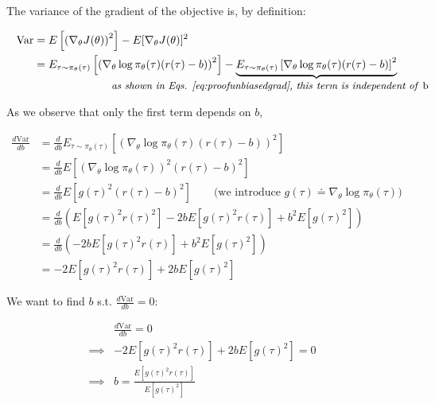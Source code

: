 \documentclass{article}
\begin{document}
The variance of the gradient of the objective is, by definition:

\begin{subequations}
  \begin{align}
    \operatorname{Var}
      &=E\left[\left(\nabla_\theta J(\theta)\right)^{2}\right]-E[\nabla_\theta J(\theta)]^2\\
      &=E_{\tau \sim \pi_{\theta}(\tau)}\left[\left(\nabla_{\theta} \log \pi_{\theta}(\tau)(r(\tau)-b)\right)^{2}\right]-\underbrace{E_{\tau \sim \pi_{\theta}(\tau)}\left[\nabla_{\theta} \log \pi_{\theta}(\tau)(r(\tau)-b)\right]^2}_{\small\llap{\textit{as shown in Eqs. \eqref{eq:proofunbiasedgrad}, this }}\rlap{\textit{term is independent of }b}}
    \end{align}
\end{subequations}

As we observe that only the first term depends on $b$,

\begin{subequations}
  \begin{align}
    \frac{d \mathrm{Var}}{d b}
      &= \frac{d}{d b} E_{\tau \sim \pi_{\theta}(\tau)}\left[\left(\nabla_{\theta} \log \pi_{\theta}(\tau)(r(\tau)-b)\right)^{2}\right]\\
      &=\frac{d}{d b} E\left[\left(\nabla_{\theta} \log \pi_{\theta}(\tau)\right)^{2}(r(\tau)-b)^{2}\right]\\
      &=\frac{d}{d b} E\left[g(\tau)^{2}(r(\tau)-b)^{2}\right] \qquad\text{(we introduce }g(\tau)\doteq\nabla_{\theta} \log \pi_{\theta}(\tau)\text{)}\\
      &=\frac{d}{d b}\left(E\left[g(\tau)^{2} r(\tau)^{2}\right]-2b E\left[g(\tau)^{2} r(\tau)\right]+b^{2} E\left[g(\tau)^{2}\right]\right)\\
      &=\frac{d}{d b}\left(-2b E\left[g(\tau)^{2} r(\tau)\right]+b^{2} E\left[g(\tau)^{2}\right]\right)\\
      &=-2 E\left[g(\tau)^{2} r(\tau)\right]+2 b E\left[g(\tau)^{2}\right]
  \end{align}
\end{subequations}

We want to find $b$ s.t. $\frac{d \mathrm{Var}}{d b} = 0$:

\begin{subequations}
  \begin{align}
    &\frac{d \mathrm{Var}}{d b} = 0 &\\
    \implies & -2 E\left[g(\tau)^{2} r(\tau)\right]+2 b E\left[g(\tau)^{2}\right] = 0 &\\
    \implies & b =\frac{E\left[g(\tau)^{2} r(\tau)\right]}{E\left[g(\tau)^{2}\right]} &
  \end{align}
\end{subequations}
\end{document}
